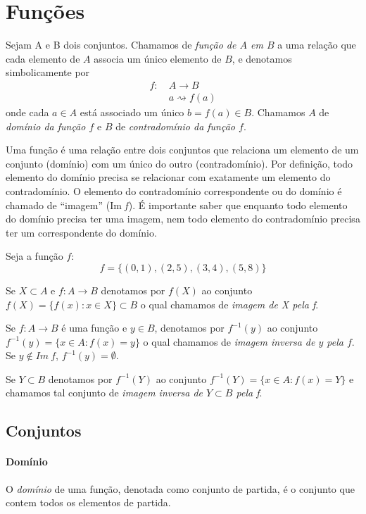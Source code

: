 \section{Funções}
\begin{df}
Sejam A e B dois conjuntos. Chamamos de \emph{função de $A$ em $B$} a uma relação que cada elemento de $A$ associa um único elemento de $B$, e denotamos simbolicamente por \begin{align*}
f: \ &A \rightarrow B \\
     &a \rightsquigarrow f(a)
\end{align*}
onde cada $a \in A$ está associado um único $b=f(a) \in B$. Chamamos $A$ de \emph{domínio da função $f$} e $B$ de \emph{contradomínio da função $f$}.
\end{df}
Uma função é uma relação entre dois conjuntos que relaciona um elemento de um conjunto (domínio) com um único do outro (contradomínio). Por definição, todo elemento do domínio precisa se relacionar com exatamente um elemento do contradomínio. O elemento do contradomínio correspondente ou do domínio é chamado de ``imagem'' ($\textrm{Im} \: f$). É importante saber que enquanto todo elemento do domínio precisa ter uma imagem, nem todo elemento do contradomínio precisa ter um correspondente do domínio.\par 

\begin{exemplo}
Seja a função $f$:\[f=\{(0,1),(2,5),(3,4),(5,8)\}\]
\end{exemplo}

Se $X \subset A$ e $f: A \rightarrow B$ denotamos por $f(X)$ ao conjunto $f(X)=\{f(x) : x \in X\} \subset B$ o qual chamamos de \textit{imagem de X pela f}. \par 
Se $f: A \rightarrow B$ é uma função e $y \in B$, denotamos por $f^{-1}(y)$ ao conjunto $f^{-1}(y)=\{x \in A : f(x)=y \}$ o qual chamamos de \emph{imagem inversa de $y$ pela $f$}. Se $y \not \in Im\:f$, $f^{-1}(y)= \emptyset$. \par 
Se $Y \subset B$ denotamos por $f^{-1}(Y)$ ao conjunto $f^{-1}(Y)=\{x\in A : f(x)=Y\}$ e chamamos tal conjunto de \emph{imagem inversa de $Y \subset B$ pela f}.

\subsection{Conjuntos}
\paragraph*{Domínio}
O \emph{domínio} de uma função, denotada como conjunto de partida, é o conjunto que contem todos os elementos de partida.
